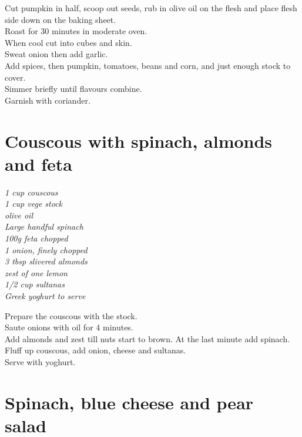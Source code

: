 \documentclass{tufte-book}
\begin{document}
Cut pumpkin in half, scoop out seeds, rub in olive oil on the flesh and place flesh side down on the baking sheet.
\\Roast for 30 minutes in moderate oven.
\\When cool cut into cubes and skin.
\\Sweat onion then add garlic.
\\Add spices, then pumpkin, tomatoes, beans and corn, and just enough stock to cover.
\\Simmer briefly until flavours combine. 
\\Garnish with coriander.



\section{Couscous with spinach, almonds and feta}

\emph{1 cup couscous
\\1 cup vege stock
\\olive oil
\\Large handful spinach
\\100g feta chopped
\\1 onion, finely chopped
\\3 tbsp slivered almonds
\\zest of one lemon
\\1/2 cup sultanas
\\Greek yoghurt to serve
}

Prepare the couscous with the stock.
\\Saute onions with oil for 4 minutes.
\\Add almonds and zest till nuts start to brown. At the last minute add spinach.
\\Fluff up couscous, add onion, cheese and sultanas.
\\Serve with yoghurt.



\section{Spinach, blue cheese and pear salad}
\end{document}
